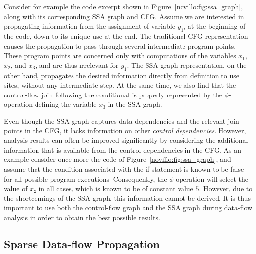Consider for example the code excerpt shown in
Figure~\ref{novillo:fig:ssa_graph}, along with its corresponding SSA graph and
CFG. Assume we are interested in propagating information from the assignment of
variable $y_1$, at the beginning of the code, down to its unique use at
the end. The traditional CFG representation causes the propagation
to pass through several intermediate program points. These program points are
concerned only with computations of the variables $x_1$, $x_2$, and $x_3$, and
are thus irrelevant for $y_1$. The SSA graph representation, on
the other hand, propagates the desired information directly from definition to
use sites, without
any intermediate step. At the same time, we also find that the control-flow
join following the conditional is properly represented by the $\phi$-operation
defining the variable $x_3$ in the SSA graph.

Even though the SSA graph captures data dependencies and the relevant join
points in the CFG, it lacks information on other
\emph{control dependencies}. However, analysis results can often be improved
significantly by considering the additional information that is available from
the control dependencies in the CFG. As an example consider once more
the code of Figure~\ref{novillo:fig:ssa_graph}, and assume that the
condition associated with the if-statement is known to be false for all
possible program executions. Consequently, the $\phi$-operation will select the
value of $x_2$ in all cases, which is known to be of constant value $5$.
However, due to the shortcomings of the SSA graph, this information cannot be
derived. It is thus important to use both the control-flow graph and the SSA
graph during data-flow analysis in order to obtain the best possible results.

\subsection{Sparse Data-flow Propagation}


